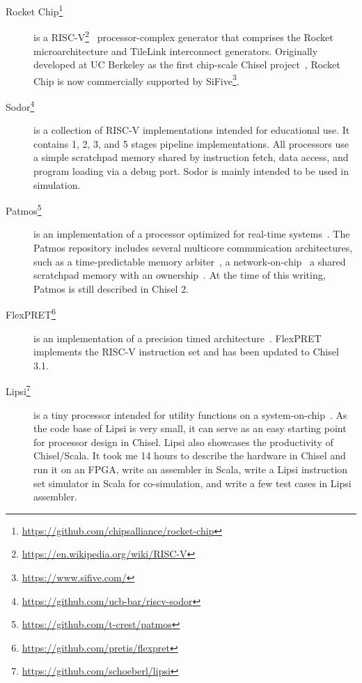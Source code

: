 \documentclass[%
    10pt,
    headinclude, footexclude,
    openright, %
    notitlepage,
    cleardoubleempty,
    headsepline,
    pointlessnumbers,
    bibtotoc, idxtotoc,
    ]{scrbook}
\newcommand{\myref}[2]{\href{#1}{#2}}
\renewcommand{\myref}[2]{{#2}{\footnote{\url{#1}}}}
\begin{document}
\begin{description}

\item[\myref{https://github.com/chipsalliance/rocket-chip}{Rocket Chip}]
is a \myref{https://en.wikipedia.org/wiki/RISC-V}{RISC-V}~\cite{risc-v}
processor-complex generator that comprises the Rocket
microarchitecture and TileLink interconnect generators.  Originally developed
at UC Berkeley as the first chip-scale Chisel project~\cite{rocket:techrep}, Rocket Chip is now
commercially supported by \myref{https://www.sifive.com/}{SiFive}.

\item[\myref{https://github.com/ucb-bar/riscv-sodor}{Sodor}] is a collection of RISC-V
implementations intended for educational use. It contains 1, 2, 3, and 5 stages pipeline
implementations. All processors use a simple scratchpad memory shared by instruction
fetch, data access, and program loading via a debug port. Sodor is mainly intended to
be used in simulation.

\item[\myref{https://github.com/t-crest/patmos}{Patmos}] is an implementation of a
processor optimized for real-time systems~\cite{patmos:rts2018}. The Patmos repository
includes several multicore communication architectures, such as a time-predictable memory
arbiter~\cite{t-crest:memnoc}, a network-on-chip~\cite{s4nocni:arcs2019}
a shared scratchpad memory with an ownership~\cite{t-crest:ownspm}.
At the time of this writing, Patmos is still described in Chisel 2.

\item[\myref{https://github.com/pretis/flexpret}{FlexPRET}] is an implementation of a
precision timed architecture~\cite{Zimmer:EECS-2015-181}. FlexPRET implements
the RISC-V instruction set and has been updated to Chisel 3.1.

\item[\myref{https://github.com/schoeberl/lipsi}{Lipsi}] is a tiny processor intended
for utility functions on a system-on-chip~\cite{lipsi:arcs2018}. As the code base of
Lipsi is very small, it can serve as an easy starting point for processor design in Chisel.
Lipsi also showcases the productivity of Chisel/Scala. It took me 14 hours to describe the
hardware in Chisel and run it on an FPGA, write an assembler in Scala, write a
Lipsi instruction set simulator in Scala for co-simulation, and write a few test cases
in Lipsi assembler.


\end{description}
\end{document}
